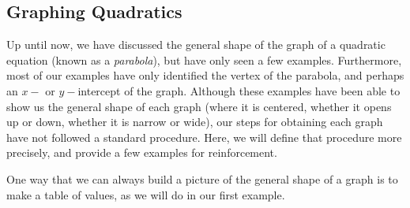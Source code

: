 \subsection{Graphing Quadratics}\pp

{}\pp

Up until now, we have discussed the general shape of the graph of a quadratic equation (known as a \textit{parabola}), but have only seen a few examples.  Furthermore, most of our examples have only identified the vertex of the parabola, and perhaps an $x-$ or $y-$intercept of the graph.  Although these examples have been able to show us the general shape of each graph (where it is centered, whether it opens up or down, whether it is narrow or wide), our steps for obtaining each graph have not followed a standard procedure.  Here, we will define that procedure more precisely, and provide a few examples for reinforcement.\pp

One way that we can always build a picture of the general shape of a graph is to make a table of values, as we will do in our first example.

